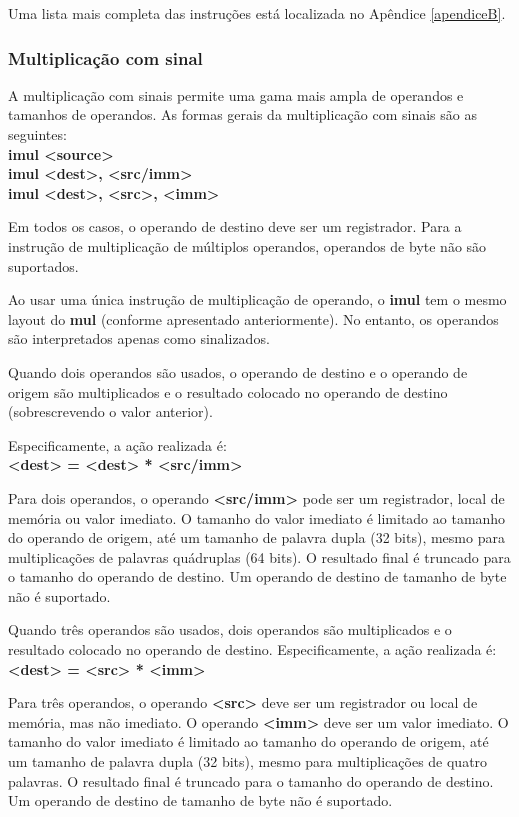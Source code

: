 Uma lista mais completa das instruções está localizada no Apêndice \ref{apendiceB}.

\subsubsection{Multiplicação com sinal}
A multiplicação com sinais permite uma gama mais ampla de operandos e tamanhos de operandos. As formas gerais da multiplicação com sinais são as seguintes:\\
\textbf{	imul <source>\\
	imul <dest>, <src/imm>\\
	imul <dest>, <src>, <imm>\\}

Em todos os casos, o operando de destino deve ser um registrador. Para a instrução de multiplicação de múltiplos operandos, operandos de byte não são suportados.

Ao usar uma única instrução de multiplicação de operando, o \textbf{imul} tem o mesmo layout do \textbf{mul} (conforme apresentado anteriormente). No entanto, os operandos são interpretados apenas como sinalizados.

Quando dois operandos são usados, o operando de destino e o operando de origem são multiplicados e o resultado colocado no operando de destino (sobrescrevendo o valor anterior).

Especificamente, a ação realizada é:\\
\textbf{<dest> = <dest> * <src/imm>}

Para dois operandos, o operando\textbf{ <src/imm>} pode ser um registrador, local de memória ou valor imediato. O tamanho do valor imediato é limitado ao tamanho do operando de origem, até um tamanho de palavra dupla (32 bits), mesmo para multiplicações de palavras quádruplas (64 bits). O resultado final é truncado para o tamanho do operando de destino. Um operando de destino de tamanho de byte não é suportado.

Quando três operandos são usados, dois operandos são multiplicados e o resultado colocado no operando de destino. Especificamente, a ação realizada é:\\
\textbf{<dest> = <src> * <imm>}

Para três operandos, o operando \textbf{<src>} deve ser um registrador ou local de memória, mas não imediato. O operando \textbf{<imm>} deve ser um valor imediato. O tamanho do valor imediato é limitado ao tamanho do operando de origem, até um tamanho de palavra dupla (32 bits), mesmo para multiplicações de quatro palavras. O resultado final é truncado para o tamanho do operando de destino. Um operando de destino de tamanho de byte não é suportado.

